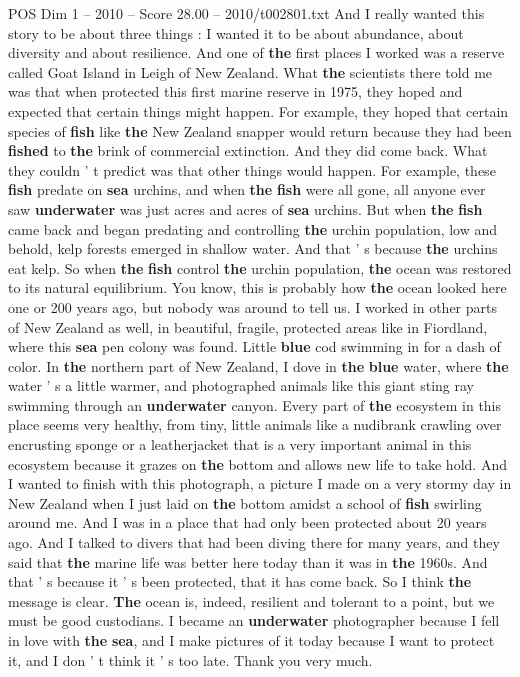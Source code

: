 \begin{textsample}{POS Dim 1 – 2010 – Score 28.00 – 2010/t002801.txt}
And I really wanted this story to be about three things : I wanted it to be about abundance, about diversity and about resilience.
And one of \textbf{the} first places I worked was a reserve called Goat Island in Leigh of New Zealand.
What \textbf{the} scientists there told me was that when protected this first marine reserve in 1975, they hoped and expected that certain things might happen.
For example, they hoped that certain species of \textbf{fish} like \textbf{the} New Zealand snapper would return because they had been \textbf{fished} to \textbf{the} brink of commercial extinction.
And they did come back.
What they couldn ' t predict was that other things would happen.
For example, these \textbf{fish} predate on \textbf{sea} urchins, and when \textbf{the} \textbf{fish} were all gone, all anyone ever saw \textbf{underwater} was just acres and acres of \textbf{sea} urchins.
But when \textbf{the} \textbf{fish} came back and began predating and controlling \textbf{the} urchin population, low and behold, kelp forests emerged in shallow water.
And that ' s because \textbf{the} urchins eat kelp.
So when \textbf{the} \textbf{fish} control \textbf{the} urchin population, \textbf{the} ocean was restored to its natural equilibrium.
You know, this is probably how \textbf{the} ocean looked here one or 200 years ago, but nobody was around to tell us.
I worked in other parts of New Zealand as well, in beautiful, fragile, protected areas like in Fiordland, where this \textbf{sea} pen colony was found.
Little \textbf{blue} cod swimming in for a dash of color.
In \textbf{the} northern part of New Zealand, I dove in \textbf{the} \textbf{blue} water, where \textbf{the} water ' s a little warmer, and photographed animals like this giant sting ray swimming through an \textbf{underwater} canyon.
Every part of \textbf{the} ecosystem in this place seems very healthy, from tiny, little animals like a nudibrank crawling over encrusting sponge or a leatherjacket that is a very important animal in this ecosystem because it grazes on \textbf{the} bottom and allows new life to take hold.
And I wanted to finish with this photograph, a picture I made on a very stormy day in New Zealand when I just laid on \textbf{the} bottom amidst a school of \textbf{fish} swirling around me.
And I was in a place that had only been protected about 20 years ago.
And I talked to divers that had been diving there for many years, and they said that \textbf{the} marine life was better here today than it was in \textbf{the} 1960s.
And that ' s because it ' s been protected, that it has come back.
So I think \textbf{the} message is clear. \textbf{The} ocean is, indeed, resilient and tolerant to a point, but we must be good custodians.
I became an \textbf{underwater} photographer because I fell in love with \textbf{the} \textbf{sea}, and I make pictures of it today because I want to protect it, and I don ' t think it ' s too late.
Thank you very much.

\end{textsample}
